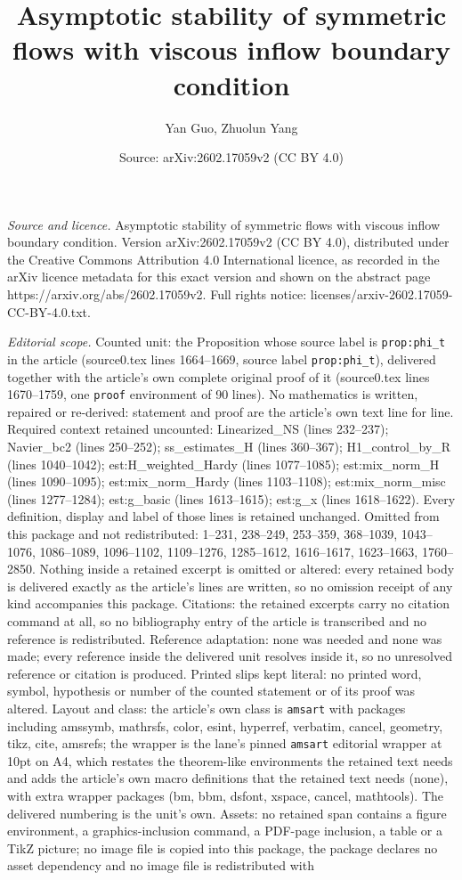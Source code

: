 \documentclass[10pt,a4paper]{amsart}
\title[Asymptotic stability of symmetric flows with viscous inflow ]{Asymptotic stability of symmetric flows with viscous inflow boundary condition}
\author{Yan Guo, Zhuolun Yang}
\date{Source: arXiv:2602.17059v2 (CC BY 4.0)}
\begin{document}
\maketitle

\noindent\emph{Source and licence.} Asymptotic stability of symmetric flows with viscous inflow boundary condition. Version arXiv:2602.17059v2 (CC BY 4.0), distributed under the Creative Commons Attribution 4.0 International licence, as recorded in the arXiv licence metadata for this exact version and shown on the abstract page https://arxiv.org/abs/2602.17059v2. Full rights notice: licenses/arxiv-2602.17059-CC-BY-4.0.txt.\par\smallskip

\noindent\textit{Editorial scope.} Counted unit: the Proposition whose source label is \texttt{prop:phi\_t} in the article (source0.tex lines 1664--1669, source label \texttt{prop:phi\_t}), delivered together with the article's own complete original proof of it (source0.tex lines 1670--1759, one \texttt{proof} environment of 90 lines). No mathematics is written, repaired or re-derived: statement and proof are the article's own text line for line. Required context retained uncounted: Linearized\_NS (lines 232--237); Navier\_bc2 (lines 250--252); ss\_estimates\_H (lines 360--367); H1\_control\_by\_R (lines 1040--1042); est:H\_weighted\_Hardy (lines 1077--1085); est:mix\_norm\_H (lines 1090--1095); est:mix\_norm\_Hardy (lines 1103--1108); est:mix\_norm\_misc (lines 1277--1284); est:g\_basic (lines 1613--1615); est:g\_x (lines 1618--1622). Every definition, display and label of those lines is retained unchanged. Omitted from this package and not redistributed: 1--231, 238--249, 253--359, 368--1039, 1043--1076, 1086--1089, 1096--1102, 1109--1276, 1285--1612, 1616--1617, 1623--1663, 1760--2850. Nothing inside a retained excerpt is omitted or altered: every retained body is delivered exactly as the article's lines are written, so no omission receipt of any kind accompanies this package. Citations: the retained excerpts carry no citation command at all, so no bibliography entry of the article is transcribed and no reference is redistributed. Reference adaptation: none was needed and none was made; every reference inside the delivered unit resolves inside it, so no unresolved reference or citation is produced. Printed slips kept literal: no printed word, symbol, hypothesis or number of the counted statement or of its proof was altered. Layout and class: the article's own class is \texttt{amsart} with packages including amssymb, mathrsfs, color, esint, hyperref, verbatim, cancel, geometry, tikz, cite, amsrefs; the wrapper is the lane's pinned \texttt{amsart} editorial wrapper at 10pt on A4, which restates the theorem-like environments the retained text needs and adds the article's own macro definitions that the retained text needs (none), with extra wrapper packages (bm, bbm, dsfont, xspace, cancel, mathtools). The delivered numbering is the unit's own. Assets: no retained span contains a figure environment, a graphics-inclusion command, a PDF-page inclusion, a table or a TikZ picture; no image file is copied into this package, the package declares no asset dependency and no image file is redistributed with 
\end{document}
